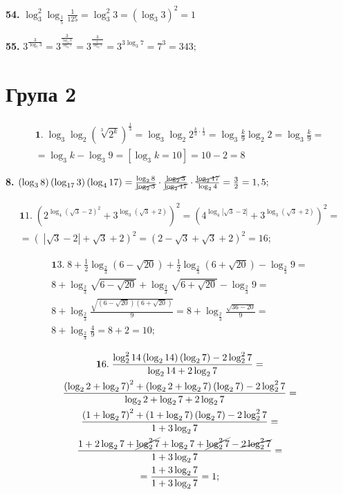 \textbf{54.} $\log^2_3 \log_{\frac{1}{5}} \frac{1}{125} = \log^2_3 3 = \left(\log_3 3\right)^2 = 1$

\textbf{55.} $3^{\frac{3}{\log_7 3}} = 3^{\frac{3}{\frac{\log_3 3}{\log_3 7}}} = 3^{\frac{3}{\frac{1}{\log_3 7}}} = 3^{3\log_3 7} = 7^3 = 343;$
\section*{Група 2}

\begin{multline*}
{\mathbf 1.}\;
\log_3\log_2 \left(\sqrt[3]{2^k}\right)^{\frac{1}{3}} =
\log_3 \log_2 2^{\frac{k}{3} \cdot \frac{1}{3}} =
\log_3 \frac{k}{9} \log_2 2 =
\log_3 \frac{k}{9} =\\
= \log_3 k - \log_3 9 = 
\left[\log_3 k = 10\right] = 
10 - 2 = 8
\end{multline*}

\textbf{8.} $\left(\log_3 8\right)\left(\log_{17} 3\right)\left(\log_4 17\right) = \frac{\log_2 8}{\cancel{\log_2 3}} \cdot \frac{\cancel{\log_2 3}}{\cancel{\log_2 17}} \cdot \frac{\cancel{\log_2 17}}{\log_2 4} = \frac{3}{2} = 1,5;$

\begin{multline*}
{\mathbf 11.}\;
\left(2^{\log_4 \left(\sqrt{3} - 2\right)^2} + 3^{\log_3 \left(\sqrt{3} + 2\right)}\right)^2 =
\left(4^{\log_4 \left|\sqrt{3} - 2\right|} + 3^{\log_3 \left(\sqrt{3} + 2\right)}\right)^2 =\\
= \left(\;\left|\sqrt{3} - 2\right| + \sqrt{3} + 2\right)^2 =
\left(2 - \sqrt{3} + \sqrt{3} + 2\right)^2 = 16;
\end{multline*}

\begin{multline*}
{\mathbf 13.}\;
8 + \frac{1}{2}\log_{\frac{2}{3}} \left(6 - \sqrt{20}\right) + \frac{1}{2}\log_{\frac{2}{3}} \left(6 + \sqrt{20}\right) - \log_{\frac{2}{3}} 9 =\\
8 + \log_{\frac{2}{3}} \sqrt{6 - \sqrt{20}} + \log_{\frac{2}{3}} \sqrt{6 + \sqrt{20}} - \log_{\frac{2}{3}} 9 =\\
8 + \log_{\frac{2}{3}} \frac{\sqrt{\left(6 - \sqrt{20}\right)\left(6 + \sqrt{20}\right)}}{9} =
8 + \log_{\frac{2}{3}} \frac{\sqrt{36 - 20}}{9} =\\
8 + \log_{\frac{2}{3}} \frac{4}{9} = 8 + 2 = 10;
\end{multline*}

\begin{multline*}
{\mathbf 16.}\;
\frac{\log_2^2 14 \left(\log_2 14\right)\left(\log_2 7\right) - 2 \log_2^2 7}{\log_2 14 + 2\log_2 7} =\\
\frac{\left(\log_2 2 + \log_2 7\right)^2 + \left(\log_2 2 + \log_2 7\right)\left(\log_2 7\right) - 2\log_2^2 7}{\log_2 2 + \log_2 7 + 2\log_2 7} =\\
\frac{\left(1 + \log_2 7\right)^2 + \left(1 + \log_2 7\right)\left(\log_2 7\right) - 2\log_2^2 7}{1 + 3\log_2 7} =\\
\frac{1 + 2\log_2 7 + \cancel{\log_2^2 7} +\log_2 7 + \cancel{\log_2^2 7}- \cancel{2\log_2^2 7}}{1 + 3\log_2 7} =\\
= \frac{1 + 3\log_2 7}{1 + 3\log_2 7} = 1;
\end{multline*}
